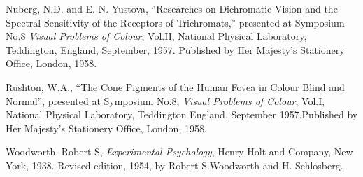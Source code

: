Nuberg, N.D. and E. N. Yustova, “Researches on Dichromatic Vision and the Spectral Sensitivity of the Receptors of Trichromats,” presented at Symposium No.8 \textit{Visual Problems of Colour}, Vol.II, National Physical Laboratory, Teddington, England, September, 1957. Published by Her Majesty's Stationery Office, London, 1958.

Rushton, W.A., “The Cone Pigments of the Human Fovea in Colour Blind and Normal”, presented at Symposium No.8, \textit{Visual Problems of Colour}, Vol.I, National Physical Laboratory, Teddington England, September 1957.Published by Her Majesty's Stationery Office, London, 1958.

Woodworth, Robert S, \textit{Experimental Psychology}, Henry Holt and Company, New York, 1938. Revised edition, 1954, by Robert S.Woodworth and H. Schlosberg.

\normalsize